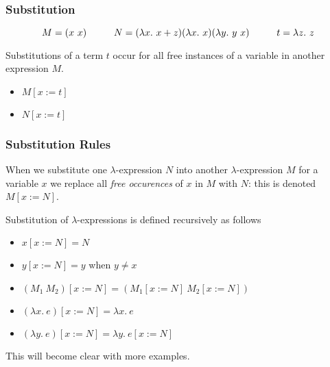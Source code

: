 \documentclass{beamer}
\begin{document}
\begin{frame}
	\frametitle{Substitution}

	$$M = (x \ x) \hspace{10mm} N = (\lambda x. \ x + z)(\lambda x. \ x)(\lambda y. \ y \ x) \hspace{10mm} t = \lambda z. \ z $$

	Substitutions of a term $t$ occur for all free instances of a variable in another expression $M$.

	\begin{itemize}
		\item[] $M[x:=t]$\vspace{5mm}
		\item[] $N[x:=t]$
	\end{itemize}

	\vspace{50mm}

\end{frame}

\begin{frame}
	\frametitle{Substitution Rules}
	
	When we substitute one $\lambda$-expression $N$ into another $\lambda$-expression $M$ for a variable $x$ we replace all \emph{free occurences} of $x$ in $M$ with $N$: this is denoted $M[x:=N]$. 
	
	Substitution of $\lambda$-expressions is defined recursively as follows

	\begin{itemize}
		\item[] $x[x:=N] = N$ \vspace{0.2cm}
		\item[] $y[x:=N] = y$ when $y \neq x$ \vspace{0.2cm}
		\item[] $(M_{1} \ M_{2})[x:=N] = (M_{1}[x:=N] \ M_{2}[x:=N])$ \vspace{0.2cm}
		\item[] $(\lambda x. \ e)[x:=N] = \lambda x. \ e$ \vspace{0.2cm}
		\item[] $(\lambda y. \ e)[x:=N] = \lambda y. \ e[x:=N]$
	\end{itemize}

	This will become clear with more examples.
	
\end{frame}
\end{document}
